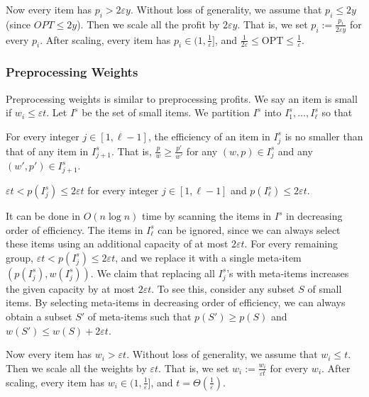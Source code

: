 \documentclass[a4paper,UKenglish,cleveref, autoref, thm-restate, pdfa]{lipics-v2021}
\newcommand{\eps}{\varepsilon}
\renewcommand{\leq}{\leqslant}
\renewcommand{\geq}{\geqslant}
\begin{document}
Now every item has $p_i > 2\eps y$. Without loss of generality, we assume that $p_i \leq 2y$ (since $OPT \leq 2y$). Then we scale all the profit by $2\eps y$. That is, we set $p_i:=  \frac{p_i}{2\eps y} $ for every $p_i$.  After scaling, every item has $p_i \in (1, \frac{1}{\eps}]$, and $\frac{1}{2\eps} \leq \mathrm{OPT} \leq \frac{1}{\eps}$.

\subsubsection{Preprocessing Weights}
Preprocessing weights is similar to preprocessing profits. We say an item is small if $w_i \leq \eps t$. Let $I^s$ be the set of small items.  We partition $I^s$ into $I^s_1, \ldots, I^s_\ell$ so that
\begin{romanenumerate}
    \item For every integer $j \in [1, \ell-1]$, the efficiency of an item in $I^s_j$ is no smaller than that of any item in $I^s_{j+1}$. That is, $\frac{p}{w} \geq \frac{p'}{w'}$ for any $(w, p) \in I^s_j$ and any $(w', p') \in I^s_{j+1}$.

    \item $\eps t < p(I^s_j) \leq 2\eps t$ for every integer $j \in [1, \ell - 1]$ and $p(I^s_\ell) \leq 2\eps t$.
\end{romanenumerate}
It can be done in $O(n \log n)$ time by scanning the items in $I^s$ in decreasing order of efficiency.  The items in $I^s_\ell$ can be ignored, since we can always select these items using an additional capacity of at most $2\eps t$. For every remaining group, $\eps t < p(I^s_j) \leq 2\eps t$, and we replace it with a single meta-item $(p(I^s_j), w(I^s_j))$. We claim that replacing all $I^s_j$'s with meta-items increases the given capacity by at most $2\eps t$. To see this, consider any subset $S$ of small items. By selecting meta-items in decreasing order of efficiency, we can always obtain a subset $S'$ of meta-items such that $p(S') \geq p(S)$ and $w(S') \leq w(S) + 2\eps t$.

Now every item has $w_i > \eps t$. Without loss of generality, we assume that $w_i \leq t$. Then we scale all the weights by $\eps t$. That is, we set $w_i:=  \frac{w_i}{\eps t} $ for every $w_i$.  After scaling, every item has $w_i \in (1, \frac{1}{\eps}]$, and $t = \Theta(\frac{1}{\eps})$.
\end{document}
